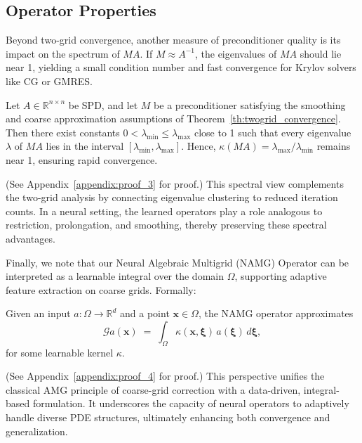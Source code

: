 \subsection{Operator Properties}

Beyond two-grid convergence, another measure of preconditioner quality is its impact on the spectrum of \(MA\). If \(M\approx A^{-1}\), the eigenvalues of \(MA\) should lie near 1, yielding a small condition number and fast convergence for Krylov solvers like CG or GMRES.

\begin{theorem}
\label{th:spectrum_clustering}
Let \(A \in \mathbb{R}^{n \times n}\) be SPD, and let \(M\) be a preconditioner satisfying the smoothing and coarse approximation assumptions of Theorem~\ref{th:twogrid_convergence}. Then there exist constants \(0 < \lambda_{\min} \le \lambda_{\max}\) close to 1 such that every eigenvalue \(\lambda\) of \(MA\) lies in the interval \([\lambda_{\min}, \lambda_{\max}]\). Hence, \(\kappa(MA)=\lambda_{\max}/\lambda_{\min} \) remains near 1, ensuring rapid convergence.
\end{theorem}

\noindent
(See Appendix~\ref{appendix:proof_3} for proof.) This spectral view complements the two-grid analysis by connecting eigenvalue clustering to reduced iteration counts. In a neural setting, the learned operators play a role analogous to restriction, prolongation, and smoothing, thereby preserving these spectral advantages.

Finally, we note that our Neural Algebraic Multigrid (NAMG) Operator can be interpreted as a learnable integral over the domain \(\Omega\), supporting adaptive feature extraction on coarse grids. Formally:

\begin{theorem}
\label{th:integral}
Given an input \(a:\Omega\to\mathbb{R}^d\) and a point \(\mathbf{x}\in\Omega\), the NAMG operator approximates
\[
    \mathcal{G}a(\mathbf{x}) 
    \;=\;
    \int_{\Omega} 
    \kappa(\mathbf{x}, \boldsymbol{\xi})\,a(\boldsymbol{\xi})
    \,d\boldsymbol{\xi},
\]
for some learnable kernel \(\kappa\). 
\end{theorem}

\noindent
(See Appendix~\ref{appendix:proof_4} for proof.) This perspective unifies the classical AMG principle of coarse-grid correction with a data-driven, integral-based formulation. It underscores the capacity of neural operators to adaptively handle diverse PDE structures, ultimately enhancing both convergence and generalization.
